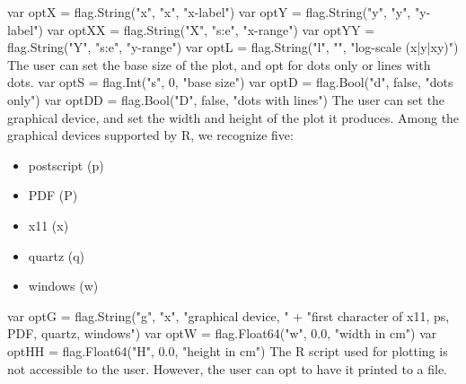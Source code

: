 var optX = flag.String("x", "x", "x-label")
var optY = flag.String("y", "y", "y-label")
var optXX = flag.String("X", "s:e", "x-range")
var optYY = flag.String("Y", "s:e", "y-range")
var optL = flag.String("l", "", "log-scale (x|y|xy)")
\nwendcode{}\nwdocspar
The user can set the base size of the plot, and opt for dots only or
lines with dots.
\nwenddocs{}\endmoddef\nwstartdeflinemarkup{}\nwenddeflinemarkup
var optS = flag.Int("s", 0, "base size")
var optD = flag.Bool("d", false, "dots only")
var optDD = flag.Bool("D", false, "dots with lines")
\nwendcode{}\nwdocspar
The user can set the graphical device, and set the width and height of
the plot it produces. Among the graphical devices supported by R, we
recognize five:
\begin{itemize}
\item postscript (p)
\item PDF (P)
\item x11 (x)
\item quartz (q)
\item windows (w)
\end{itemize}
\nwenddocs{}\endmoddef\nwstartdeflinemarkup{}\nwenddeflinemarkup
var optG = flag.String("g", "x", "graphical device, " +
          "first character of x11, ps, PDF, quartz, windows")
var optW = flag.Float64("w", 0.0, "width in cm")
var optHH = flag.Float64("H", 0.0, "height in cm")
\nwendcode{}\nwdocspar
The R script used for plotting is not accessible to the user. However,
the user can opt to have it printed to a file.
\nwenddocs{}\endmoddef\nwstartdeflinemarkup{}\nwenddeflinemarkup
